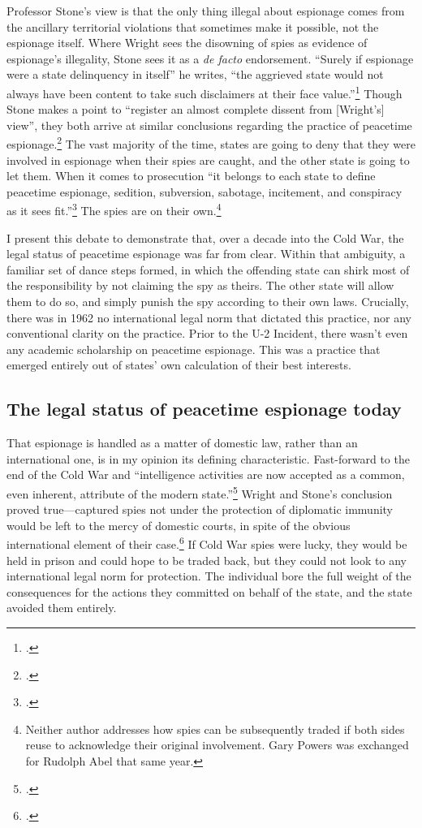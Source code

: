 \documentclass{report}
\begin{document}
\begin{refsegment}
Professor Stone's view is that the only thing illegal about espionage comes from the ancillary territorial violations that sometimes make it possible, not the espionage itself. Where Wright sees the disowning of spies as evidence of espionage's illegality, Stone sees it as a \emph{de facto} endorsement. ``Surely if espionage were a state delinquency in itself'' he writes, ``the aggrieved state would not always have been content to take such disclaimers at their face value.''\footcite[p.~33]{stone_legal_1962} Though Stone makes a point to ``register an almost complete dissent from [Wright's] view'', they both arrive at similar conclusions regarding the practice of peacetime espionage.\footcite[p.~33]{stone_legal_1962} The vast majority of the time, states are going to deny that they were involved in espionage when their spies are caught, and the other state is going to let them. When it comes to prosecution ``it belongs to each state to define peacetime espionage, sedition, subversion, sabotage, incitement, and conspiracy as it sees fit.''\footcite[p.~4]{wright_espionage_1962} The spies are on their own.\footnote{Neither author addresses how spies can be subsequently traded if both sides reuse to acknowledge their original involvement. Gary Powers was exchanged for Rudolph Abel that same year.}

I present this debate to demonstrate that, over a decade into the Cold War, the legal status of peacetime espionage was far from clear. Within that ambiguity, a familiar set of dance steps formed, in which the offending state can shirk most of the responsibility by not claiming the spy as theirs. The other state will allow them to do so, and simply punish the spy according to their own laws. Crucially, there was in 1962 no international legal norm that dictated this practice, nor any conventional clarity on the practice. Prior to the U-2 Incident, there wasn't even any academic scholarship on peacetime espionage. This was a practice that emerged entirely out of states' own calculation of their best interests.

\subsection{The legal status of peacetime espionage today}
That espionage is handled as a matter of domestic law, rather than an international one, is in my opinion its defining characteristic. Fast-forward to the end of the Cold War and ``intelligence activities are now accepted as a common, even inherent, attribute of the modern state.''\footcite[p.~321]{demarest_espionage_1995} Wright and Stone's conclusion proved true---captured spies not under the protection of diplomatic immunity would be left to the mercy of domestic courts, in spite of the obvious international element of their case.\footcite[p.~330]{demarest_espionage_1995} If Cold War spies were lucky, they would be held in prison and could hope to be traded back, but they could not look to any international legal norm for protection.  The individual bore the full weight of the consequences for the actions they committed on behalf of the state, and the state avoided them entirely.


\end{refsegment}
\end{document}
